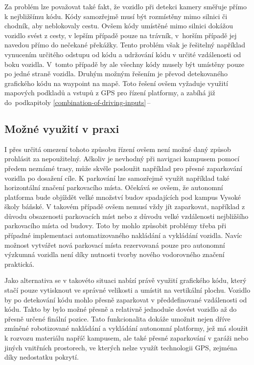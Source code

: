 \documentclass[czech, bachelor]{diploma}
\newcommand{\peteref}[1]{\ref{#1}\,--\,\nameref{#1}}
\begin{document}
Za problém lze považovat také fakt, že vozidlo při detekci kamery směřuje přímo k nejbližšímu kódu. Kódy samozřejmě musí být
rozmístěny mimo silnici či chodník, aby neblokovaly cestu. Ovšem kódy umístěné mimo silnici dokážou vozidlo svést z cesty,
v lepším případě pouze na trávník, v~horším případě jej navedou přímo do nečekané překážky. Tento problém však je řešitelný
například vynucením určitého odstupu od kódu a udržování kódu v určité vzdálenosti od boku vozidla.  V~tomto případě by ale
všechny kódy musely být umístěny pouze po jedné straně vozidla. Druhým možným řešením je převod detekovaného grafického kódu
na waypoint na mapě. Toto řešení ovšem vyžaduje využití mapových podkladů a vstupů z GPS pro řízení platformy, a zabíhá již
do~podkapitoly \peteref{combination-of-driving-inputs}

\subsection{Možné využití v praxi}

I přes určitá omezení tohoto způsobu řízení ovšem není možné daný způsob prohlásit za nepoužitelný. Ačkoliv je nevhodný
při navigaci kampusem pomocí předem neznámé trasy, může skvěle posloužit například pro přesné zaparkování vozidla po dosažení
cíle. K parkování lze samozřejmě využít například také horizontální značení parkovacího místa. Očekává se ovšem, že autonomní
platforma bude objíždět velké množství budov spadajících pod kampus Vysoké školy báňské. V takovém případě ovšem nemusí vždy jít
zaparkovat, například z důvodu obsazenosti parkovacích míst nebo z důvodu velké vzdálenosti nejbližšího parkovacího místa
od budovy. Toto by mohlo způsobit problémy třeba při případné implementaci automatizovaného nakládání a vykládání vozidla. Navíc
možnost vytvářet nová parkovací místa rezervovaná pouze pro autonomní výzkumná vozidla není díky nutnosti tvorby nového
vodorovného značení praktická.

Jako alternativa se v takovéto situaci nabízí právě využití grafického kódu, který stačí pouze vytisknout ve správné velikosti
a umístit na vertikální plochu. Vozidlo by po detekování kódu mohlo přesně zaparkovat v předdefinované vzdálenosti od kódu. Takto
by bylo možné přesně a relativně jednoduše dovést vozidlo až do přesně určené finální pozice. Tato funkcionalita dokáže umožnit
nejen dříve zmíněné robotizované nakládání a vykládání autonomní platformy, jež má sloužit k rozvozu materiálu napříč kampusem,
ale také přesné zaparkování v garáži nebo jiných vnitřních prostorech, ve kterých nelze využít technologii GPS, zejména díky
nedostatku pokrytí.
\end{document}
